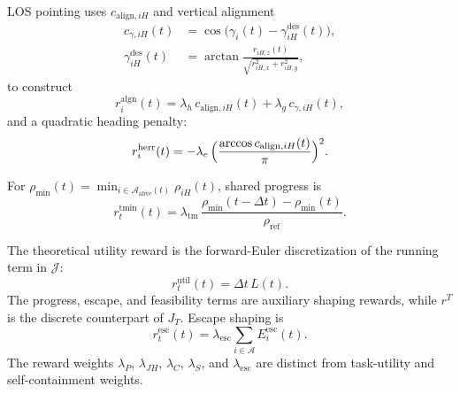 \documentclass{cja}
\begin{document}
LOS pointing uses $c_{\mathrm{align},iH}$ and vertical alignment
\begin{equation}
\begin{aligned}
c_{\gamma,iH}(t)
&=\cos\!\bigl(\gamma_i(t)-\gamma_{iH}^{\mathrm{des}}(t)\bigr),\\
\gamma_{iH}^{\mathrm{des}}(t)
&=\arctan\!\frac{r_{iH,z}(t)}{\sqrt{r_{iH,x}^{2}+r_{iH,y}^{2}}},
\end{aligned}
\end{equation}
to construct
\begin{equation}
r_i^{\mathrm{algn}}(t)=\lambda_h\,c_{\mathrm{align},iH}(t)+\lambda_g\,c_{\gamma,iH}(t),
\label{eq:r-align}
\end{equation}
and a quadratic heading penalty:
\begin{equation}
r_i^{\mathrm{herr}}(t)=-\lambda_e\,\Bigl(\dfrac{\arccos c_{\mathrm{align},iH}(t)}{\pi}\Bigr)^{2}.
\label{eq:r-herr}
\end{equation}

For $\rho_{\min}(t)=\min_{i\in\mathcal{A}_{\mathrm{alive}}(t)}\rho_{iH}(t)$, shared progress is
\begin{equation}
r_t^{\mathrm{tmin}}(t)=\lambda_{\mathrm{tm}}\,\frac{\rho_{\min}(t-\Delta t)-\rho_{\min}(t)}{\rho_{\mathrm{ref}}}.
\label{eq:r-team}
\end{equation}

The theoretical utility reward is the forward-Euler discretization of the running term in $\mathcal J$:
\begin{equation}
r_t^{\mathrm{util}}(t)
=
\Delta t\,L(t).
\label{eq:r-prior}
\end{equation}
The progress, escape, and feasibility terms are auxiliary shaping rewards, while $r^T$ is the discrete counterpart of $J_T$. Escape shaping is
\begin{equation}
r_t^{\mathrm{esc}}(t)=\lambda_{\mathrm{esc}}\sum_{i\in\mathcal{A}}E_i^{\mathrm{esc}}(t).
\end{equation}
The reward weights $\lambda_P$, $\lambda_{JH}$, $\lambda_C$, $\lambda_S$, and $\lambda_{\mathrm{esc}}$ are distinct from task-utility and self-containment weights.
\end{document}
